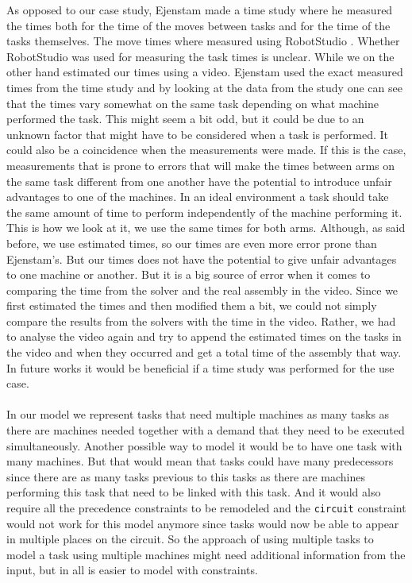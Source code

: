 As opposed to our case study, Ejenstam made a time study where he measured the times both for the time of the moves between tasks and for the time of the tasks themselves. The move times where measured using RobotStudio \cite{robotstudio}. Whether RobotStudio was used for measuring the task times is unclear. While we on the other hand estimated our times using a video. Ejenstam used the exact measured times from the time study and by looking at the data from the study one can see that the times vary somewhat on the same task depending on what machine performed the task. This might seem a bit odd, but it could be due to an unknown factor that might have to be considered when a task is performed. It could also be a coincidence when the measurements were made. If this is the case, measurements that is prone to errors that will make the times between arms on the same task different from one another have the potential to introduce unfair advantages to one of the machines. In an ideal environment a task should take the same amount of time to perform independently of the machine performing it. This is how we look at it, we use the same times for both arms. Although, as said before, we use estimated times, so our times are even more error prone than Ejenstam's. But our times does not have the potential to give unfair advantages to one machine or another. But it is a big source of error when it comes to comparing the time from the solver and the real assembly in the video. Since we first estimated the times and then modified them a bit, we could not simply compare the results from the solvers with the time in the video. Rather, we had to analyse the video again and try to append the estimated times on the tasks in the video and when they occurred and get a total time of the assembly that way. In future works it would be beneficial if a time study was performed for the use case.
\\\\
In our model we represent tasks that need multiple machines as many tasks as there are machines needed together with a demand that they need to be executed simultaneously. Another possible way to model it would be to have one task with many machines. But that would mean that tasks could have many predecessors since there are as many tasks previous to this tasks as there are machines performing this task that need to be linked with this task. And it would also require all the precedence constraints to be remodeled and the \texttt{circuit} constraint would not work for this model anymore since tasks would now be able to appear in multiple places on the circuit. So the approach of using multiple tasks to model a task using multiple machines might need additional information from the input, but in all is easier to model with constraints.

